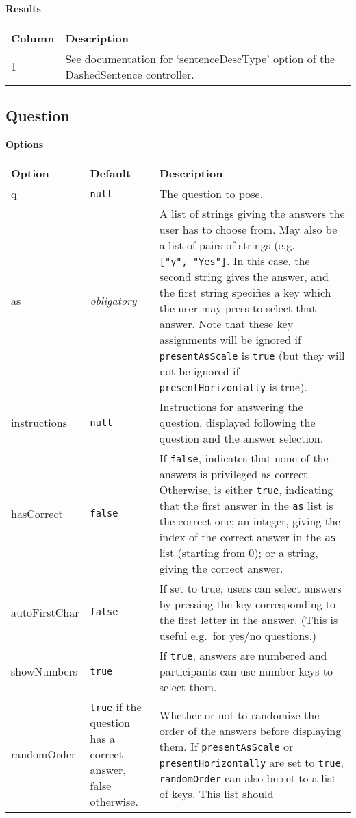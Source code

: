 \documentclass[]{article}
\begin{document}
\textbf{Results}

\begin{longtable}[c]{p{1in}p{5in}}
\toprule
\textbf{Column} & \textbf{Description}\tabularnewline
\midrule
\endhead
1 & See documentation for `sentenceDescType' option of the
DashedSentence controller.\tabularnewline
\bottomrule
\end{longtable}

\subsection{Question}\label{question}

\textbf{Options}

\begin{longtable}[c]{p{1in}p{1in}p{3.85in}}
\toprule
\textbf{Option} & \textbf{Default} & \textbf{Description}\tabularnewline
\midrule
\endhead
q & \texttt{null} & The question to pose.\tabularnewline
as & \emph{obligatory} & A list of strings giving the answers the user
has to choose from. May also be a list of pairs of strings (e.g.
\texttt{{[}"y",\ "Yes"{]}}. In this case, the second string gives the
answer, and the first string specifies a key which the user may press to
select that answer. Note that these key assignments will be ignored if
\texttt{presentAsScale} is \texttt{true} (but they will not be ignored
if \texttt{presentHorizontally} is true).\tabularnewline
instructions & \texttt{null} & Instructions for answering the question,
displayed following the question and the answer
selection.\tabularnewline
hasCorrect & \texttt{false} & If \texttt{false}, indicates that none of
the answers is privileged as correct. Otherwise, is either
\texttt{true}, indicating that the first answer in the \texttt{as} list
is the correct one; an integer, giving the index of the correct answer
in the \texttt{as} list (starting from 0); or a string, giving the
correct answer.\tabularnewline
autoFirstChar & \texttt{false} & If set to true, users can select
answers by pressing the key corresponding to the first letter in the
answer. (This is useful e.g.~for yes/no questions.)\tabularnewline
showNumbers & \texttt{true} & If \texttt{true}, answers are numbered and
participants can use number keys to select them.\tabularnewline
randomOrder & \texttt{true} if the question has a correct answer, false
otherwise. & Whether or not to randomize the order of the answers before
displaying them. If \texttt{presentAsScale} or
\texttt{presentHorizontally} are set to \texttt{true},
\texttt{randomOrder} can also be set to a list of keys. This list should

\end{longtable}
\end{document}
